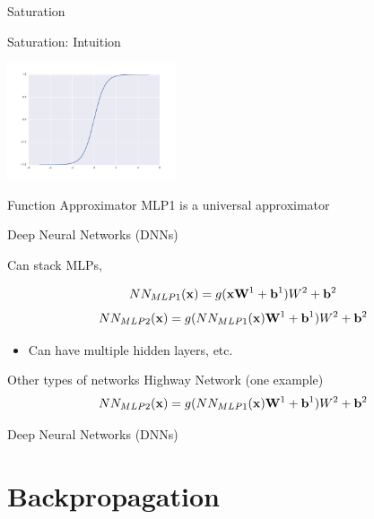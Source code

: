 \documentclass{beamer}
\begin{document}
\begin{frame}{Saturation}
  
\end{frame}


\begin{frame}{Saturation: Intuition}
  
\end{frame}


\begin{frame}
    \includegraphics[width=5cm]{../notebooks/tanh}
\end{frame}



\begin{frame}{Function Approximator}
  MLP1 is a universal approximator
\end{frame}

\begin{frame}{Deep Neural Networks (DNNs)}

  Can stack MLPs, 

  \[NN_{MLP1}(\mathbf{x}) =  g(\mathbf{x}\mathbf{W}^1 + \mathbf{b}^1)W^2 + \mathbf{b}^2\]
  \[NN_{MLP2}(\mathbf{x}) =  g(NN_{MLP1}(\mathbf{x}) \mathbf{W}^1 + \mathbf{b}^1)W^2 + \mathbf{b}^2\]

  \begin{itemize}
  \item Can have multiple hidden layers, etc.
  \end{itemize}
\end{frame}


\begin{frame}{Other types of networks}
  Highway Network (one example)
  \[NN_{MLP2}(\mathbf{x}) =  g(NN_{MLP1}(\mathbf{x}) \mathbf{W}^1 + \mathbf{b}^1)W^2 + \mathbf{b}^2\]

\end{frame}


\begin{frame}{Deep Neural Networks (DNNs)}
  
\end{frame}

\section{Backpropagation}
\end{document}
